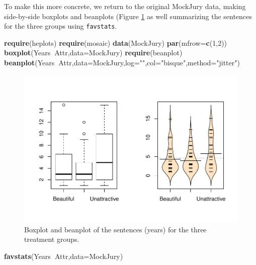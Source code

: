\documentclass[]{book}
\newenvironment{Shaded}{\begin{snugshade}}{\end{snugshade}}
\newcommand{\KeywordTok}[1]{\textcolor[rgb]{0.13,0.29,0.53}{\textbf{#1}}}
\newcommand{\DataTypeTok}[1]{\textcolor[rgb]{0.13,0.29,0.53}{#1}}
\newcommand{\DecValTok}[1]{\textcolor[rgb]{0.00,0.00,0.81}{#1}}
\newcommand{\StringTok}[1]{\textcolor[rgb]{0.31,0.60,0.02}{#1}}
\newcommand{\OperatorTok}[1]{\textcolor[rgb]{0.81,0.36,0.00}{\textbf{#1}}}
\newcommand{\NormalTok}[1]{#1}
\begin{document}
To make this more concrete, we return to the original MockJury data,
making side-by-side boxplots and beanplots (Figure \ref{fig:Figure3-1}
as well summarizing the sentences for the three groups using
\texttt{favstats}.




\begin{Shaded}
\begin{Highlighting}[]
\KeywordTok{require}\NormalTok{(heplots)}
\KeywordTok{require}\NormalTok{(mosaic)}
\KeywordTok{data}\NormalTok{(MockJury)}
\KeywordTok{par}\NormalTok{(}\DataTypeTok{mfrow=}\KeywordTok{c}\NormalTok{(}\DecValTok{1}\NormalTok{,}\DecValTok{2}\NormalTok{))}
\KeywordTok{boxplot}\NormalTok{(Years}\OperatorTok{~}\NormalTok{Attr,}\DataTypeTok{data=}\NormalTok{MockJury)}
\KeywordTok{require}\NormalTok{(beanplot)}
\KeywordTok{beanplot}\NormalTok{(Years}\OperatorTok{~}\NormalTok{Attr,}\DataTypeTok{data=}\NormalTok{MockJury,}\DataTypeTok{log=}\StringTok{""}\NormalTok{,}\DataTypeTok{col=}\StringTok{"bisque"}\NormalTok{,}\DataTypeTok{method=}\StringTok{"jitter"}\NormalTok{)}
\end{Highlighting}
\end{Shaded}

\begin{figure}
\centering
\includegraphics{GreenwoodBanner_files/figure-latex/Figure3-1-1.pdf}
\caption{\label{fig:Figure3-1}Boxplot and beanplot of the sentences (years) for the three
treatment groups.}
\end{figure}

\begin{Shaded}
\begin{Highlighting}[]
\KeywordTok{favstats}\NormalTok{(Years}\OperatorTok{~}\NormalTok{Attr,}\DataTypeTok{data=}\NormalTok{MockJury)}
\end{Highlighting}
\end{Shaded}
\end{document}
